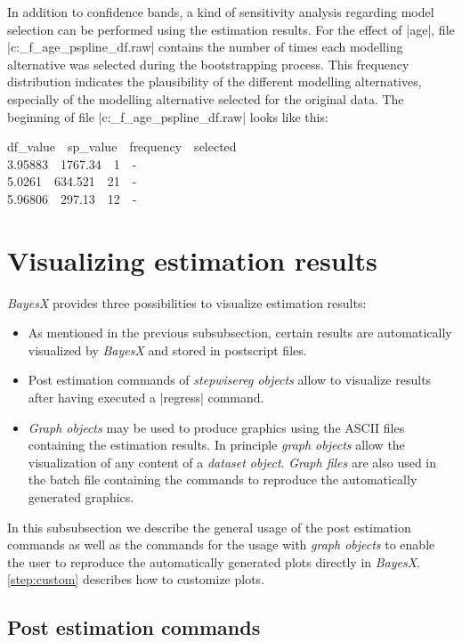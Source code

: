 In addition to confidence bands, a kind of sensitivity analysis regarding model selection can be performed using the estimation
results. For the effect of |age|, file |c:\data\s_f_age_pspline_df.raw| contains the number of times each modelling alternative
was selected during the bootstrapping process. This frequency distribution indicates the plausibility of the different
modelling alternatives, especially of the modelling alternative selected for the original data. The beginning of file
|c:\data\s_f_age_pspline_df.raw| looks like this:

{\footnotesize
df\_value \,\,   sp\_value \,\, frequency \,\, selected \\
3.95883 \,\,  1767.34  \,\, 1  \,\, - \\
5.0261 \,\,  634.521 \,\,  21  \,\, - \\
5.96806 \,\,  297.13 \,\,  12 \,\,  -}


\section{Visualizing estimation results}\label{step:visual}

{\it BayesX} provides three possibilities to visualize estimation results:
\begin{itemize}
\item As mentioned in the previous subsubsection, certain results are automatically visualized by {\it BayesX} and stored
    in postscript files. \item Post estimation commands of {\it stepwisereg objects} allow to visualize results after
    having executed a |regress| command. \item {\it Graph objects} may be used to produce graphics using the ASCII files
    containing the estimation results. In principle {\it graph objects} allow the visualization of any content of a {\it
    dataset object}. {\it Graph files} are also used in the batch file containing the commands to reproduce the
    automatically generated graphics.
\end{itemize}

In this subsubsection we describe the general usage of the post estimation commands as well as the commands for the usage with
{\it graph objects} to enable the user to reproduce the automatically generated plots directly in {\it BayesX}.
\ref{step:custom} describes how to customize plots.

\subsection{Post estimation commands}

